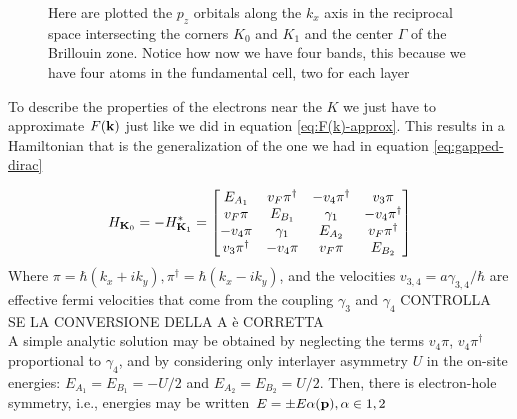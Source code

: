 \begin{figure}[h]
    \caption{Here are plotted the $p_z$ orbitals along the $k_x$ axis in the reciprocal space intersecting the corners $K_0$ and $K_1$ and the center $\Gamma$ of the Brillouin zone. Notice how now we have four bands, this because we have four atoms in the fundamental cell, two for each layer}
    \label{fig:dispersion-bilayer}
\end{figure}
To describe the properties of the electrons near the $K$ we just have to approximate $F(\mathbf{k})$ just like we did in equation \ref{eq:F(k)-approx}. This results in a Hamiltonian that is the generalization of the one we had in equation \ref{eq:gapped-dirac}

\begin{equation}
    H_{\mathbf{K}_0}=-H_{\mathbf{K}_1}^*=
    \begin{bmatrix}
        E_{A_1} & v_F\pi^\dag & -v_4\pi^\dag & v_3\pi\\
        v_F\pi& E_{B_1} & \gamma_1 & -v_4\pi^\dag\\
        -v_4\pi & \gamma_1 & E_{A_2} & v_F\pi^\dag\\
        v_3\pi^\dag & -v_4\pi & v_F\pi & E_{B_2}
    \end{bmatrix}
\end{equation}
Where $\pi= \hbar (k_x+ik_y),\pi^\dag=\hbar (k_x-ik_y)$, and the velocities $v_{3,4}=a\gamma_{3,4}/\hbar$ are effective fermi velocities that come from the coupling $\gamma_3$ and $\gamma_4$ CONTROLLA SE LA CONVERSIONE DELLA A è CORRETTA\\
A simple analytic solution may be obtained by neglecting the terms $v_4\pi$, $v_4\pi^\dag$ proportional to $\gamma_4$, and by considering only interlayer asymmetry $U$ in the on-site energies: $E_{A_1}=E_{B_1} = -U/2$ and $E_{A_2} = E_{B_2} = U/2$. Then, there is electron-hole symmetry, i.e., energies may be written $E = \pm E\alpha(\mathbf{p}), \alpha \in {1, 2}$


